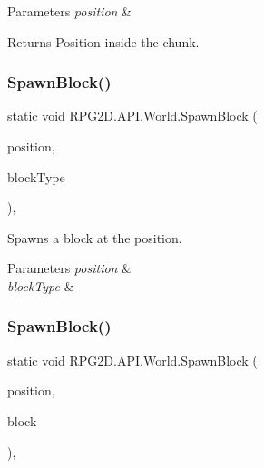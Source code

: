 \begin{DoxyParams}{Parameters}
{\em position} & \\
\hline
\end{DoxyParams}
\begin{DoxyReturn}{Returns}
Position inside the chunk.
\end{DoxyReturn}
\mbox{\label{class_r_p_g2_d_1_1_a_p_i_1_1_world_a3244e543b87453f50bb93a9d869caa83}} 
\subsubsection{\texorpdfstring{Spawn\+Block()}{SpawnBlock()}\hspace{0.1cm}{\footnotesize\ttfamily [1/2]}}
{\footnotesize\ttfamily static void R\+P\+G2\+D.\+A\+P\+I.\+World.\+Spawn\+Block (\begin{DoxyParamCaption}\item[{Vector2\+Int}]{position,  }\item[{System.\+Type}]{block\+Type }\end{DoxyParamCaption})\hspace{0.3cm}{\ttfamily [inline]}, {\ttfamily [static]}}



Spawns a block at the position. 


\begin{DoxyParams}{Parameters}
{\em position} & \\
\hline
{\em block\+Type} & \\
\hline
\end{DoxyParams}
\mbox{\label{class_r_p_g2_d_1_1_a_p_i_1_1_world_a36e060049f16cc356f30afded645521c}} 
\subsubsection{\texorpdfstring{Spawn\+Block()}{SpawnBlock()}\hspace{0.1cm}{\footnotesize\ttfamily [2/2]}}
{\footnotesize\ttfamily static void R\+P\+G2\+D.\+A\+P\+I.\+World.\+Spawn\+Block (\begin{DoxyParamCaption}\item[{Vector2\+Int}]{position,  }\item[{\mbox{\hyperlink{class_r_p_g2_d_1_1_base_classes_1_1_block}{Base\+Classes.\+Block}}}]{block }\end{DoxyParamCaption})\hspace{0.3cm}{\ttfamily [inline]}, {\ttfamily [static]}}



